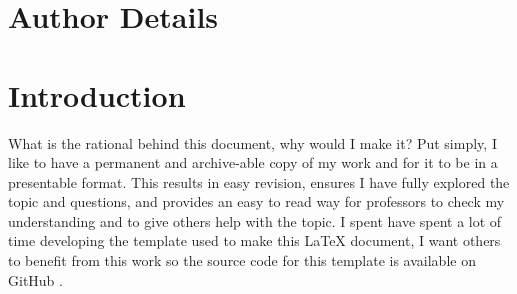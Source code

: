 \documentclass[colorlinks,11pt,a4paper,normalphoto,withhyper,ragged2e]{altareport}
\begin{document}
\MakeReportTitlePage


\setcounter{page}{1}






\section*{Author Details}
\makeauthordetails

\setcounter{tocdepth}{2} 
\tableofcontents %





\section*{Introduction}
What is the rational behind this document, why would I make it? \linebreak
Put simply, I like to have a permanent and archive-able copy of my work and for it to be in a presentable format. This results in easy revision, ensures I have fully explored the topic and questions, and provides an easy to read way for professors to check my understanding and to give others help with the topic. \linebreak 
I spent have spent a lot of time developing the template used to make this {\LaTeX} document, I want others to benefit from this work so the source code for this template is available on GitHub \cite{JenningsWilson2021}.
\newpage
{} %
\end{document}
